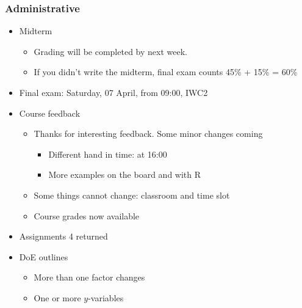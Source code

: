 \begin{frame}\frametitle{Administrative}
	\begin{itemize}
		\item	Midterm 
		\begin{itemize}
			\item	Grading will be completed by next week. 
			\item	If you didn't write the midterm, final exam counts 45\% + 15\% = 60\% 
		\end{itemize}
	\end{itemize}
	\begin{itemize}
		\item	Final exam: Saturday, 07 April, from 09:00, IWC2 
	\end{itemize}
	\begin{itemize}
		\item	Course feedback 
		\begin{itemize}
			\item	Thanks for interesting feedback. Some minor changes coming 
			\begin{itemize}
				\item	Different hand in time: at 16:00 
				\item	More examples on the board and with R 
			\end{itemize}
			\item	Some things cannot change: classroom and time slot 
			\item	Course grades now available 
		\end{itemize}
	\end{itemize}
	\begin{itemize}
		\item	Assignments 4 returned 
	\end{itemize}
	\begin{itemize}
		\item	DoE outlines 
		\begin{itemize}
			\item	More than one factor changes 
			\item	One or more $y$-variables 
		\end{itemize}
	\end{itemize}
\end{frame}


